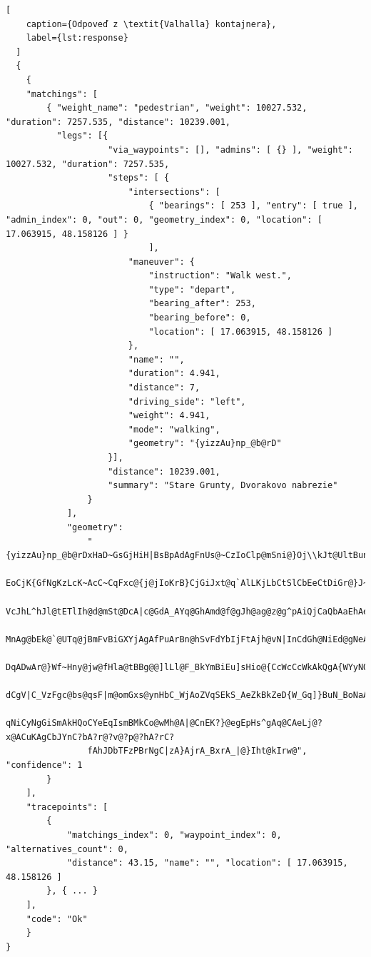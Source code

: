 \begin{lstlisting}[
    caption={Odpoveď z \textit{Valhalla} kontajnera},
    label={lst:response}
  ]
  {
    {
    "matchings": [
        { "weight_name": "pedestrian", "weight": 10027.532, "duration": 7257.535, "distance": 10239.001,
          "legs": [{
                    "via_waypoints": [], "admins": [ {} ], "weight": 10027.532, "duration": 7257.535,
                    "steps": [ { 
                        "intersections": [ 
                            { "bearings": [ 253 ], "entry": [ true ], "admin_index": 0, "out": 0, "geometry_index": 0, "location": [ 17.063915, 48.158126 ] } 
                            ],
                        "maneuver": {
                            "instruction": "Walk west.",
                            "type": "depart",
                            "bearing_after": 253,
                            "bearing_before": 0,
                            "location": [ 17.063915, 48.158126 ]
                        },
                        "name": "",
                        "duration": 4.941,
                        "distance": 7,
                        "driving_side": "left",
                        "weight": 4.941,
                        "mode": "walking",
                        "geometry": "{yizzAu}np_@b@rD"
                    }],
                    "distance": 10239.001,
                    "summary": "Stare Grunty, Dvorakovo nabrezie"
                }
            ],
            "geometry": 
                "{yizzAu}np_@b@rDxHaD~GsGjHiH|BsBpAdAgFnUs@~CzIoClp@mSni@}Oj\\kJt@UltBun@jLgD|\\gKnKaG~QyKrBaA~
                EoCjK{GfNgKzLcK~AcC~CqFxc@{j@jIoKrB}CjGiJxt@q`AlLKjLbCtSlCbEeCtDiGr@}J~@_b@NcHRyIhByz@|@e`@f@}T
                VcJhL^hJl@tETlIh@d@mSt@DcA|c@GdA_AYq@GhAmd@f@gJh@ag@z@g^pAiQjCaQbAaEhAeDbEkKdBgEhCkEhByBdDoC`Ri
                MnAg@bEk@`@UTq@jBmFvBiGXYjAgAfPuArBn@hSvFdYbIjFtAjh@vN|InCdGh@NiEd@gNeAGD{A@]Bu@HuBhAJGvBEpAw@I
                DqADwAr@}Wf~Hny@jw@fHla@tBBg@@]lLl@F_BkYmBiEu]sHio@{CcWcCcWkAkQgA{WYyNO{N@yMHsM\\sOt@qQr@yL`A}L
                dCgV|C_VzFgc@bs@qsF|m@omGxs@ynHbC_WjAoZVqSEkS_AeZkBkZeD{W_Gq]}BuN_BoNaAeRUgO~AexAJuKnA{jAm@wSgB
                qNiCyNgGiSmAkHQoCYeEqIsmBMkCo@wMh@A|@CnEK?}@egEpHs^gAq@CAeLj@?x@ACuKAgCbJYnC?bA?r@?v@?p@?hA?rC?
                fAhJDbTFzPBrNgC|zA}AjrA_BxrA_|@}Iht@kIrw@", "confidence": 1
        }
    ],
    "tracepoints": [
        {
            "matchings_index": 0, "waypoint_index": 0, "alternatives_count": 0,
            "distance": 43.15, "name": "", "location": [ 17.063915, 48.158126 ]
        }, { ... }
    ],
    "code": "Ok"
    } 
}
  \end{lstlisting}

